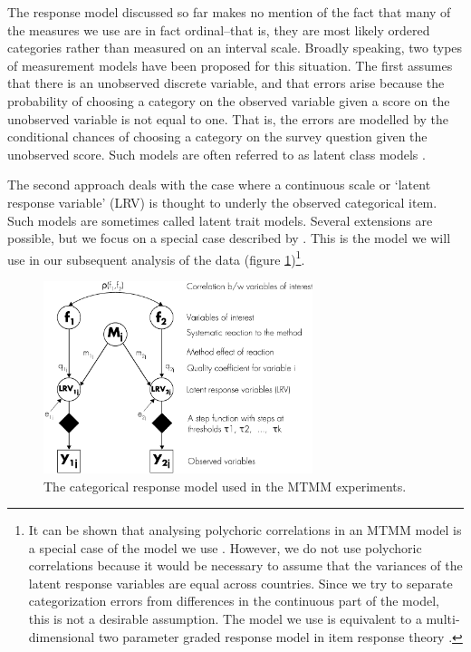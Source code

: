 \documentclass[a4paper,12pt]{article}
\begin{document}
The response model discussed so far makes no mention of the fact that many of the measures we use are in fact ordinal--that is, they are most likely ordered categories rather than measured on an interval scale. 
Broadly speaking, two types of measurement models have been proposed for this situation. The first assumes that there is an unobserved discrete variable, and that errors arise because the probability of choosing a category on the observed variable given a score on the unobserved variable is not equal to one. That is, the errors are modelled by the conditional chances of choosing a category on the survey question given the unobserved score. Such models are often referred to as latent class models \citep{lazarsfeld_latent_1968,hagenaars_applied_2002}.

The second approach deals with the case where a continuous scale or `latent response variable' (LRV) is thought to underly the observed categorical item. Such models are sometimes called latent trait models. Several extensions are possible, but we focus on a special case described by \citet{muthen_general_1984}. This is the model we will use in our subsequent analysis of the data (figure \ref{fig:response_categ})\footnote{It can be shown that analysing polychoric correlations in an MTMM model is a special case of the model we use \citep{muthen_latent_2002}. However, we do not use polychoric correlations because it would be  necessary to assume that the variances of the latent response variables are equal across countries. Since we try to separate categorization errors from differences in the continuous part of the model, this is not a desirable assumption. The model we use is equivalent to a multi-dimensional two parameter graded response model in item response theory \citep{muthen_latent_2002}.}.

\begin{figure}[htb]\centering \includegraphics[width=0.7\textwidth]{i/response_model_categorical} \caption{The categorical response model used in the MTMM experiments.\label{fig:response_categ}} \end{figure}
\end{document}
